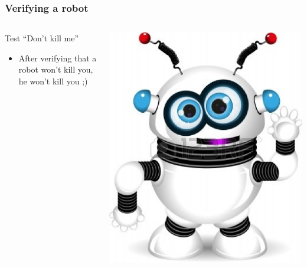 \documentclass{beamer}
\begin{document}
\begin{frame}
\frametitle{Verifying a robot}

    \begin{columns}[c] %
    \begin{block}{Test \color{red}``Don't kill me''}
    \begin{itemize}
      \item After verifying that a robot won't kill you, he won't kill you
      ;)
    \end{itemize}
    \end{block}
    \includegraphics[width=\textwidth]{../img/robot}
    \end{columns}
\end{frame}
\end{document}
